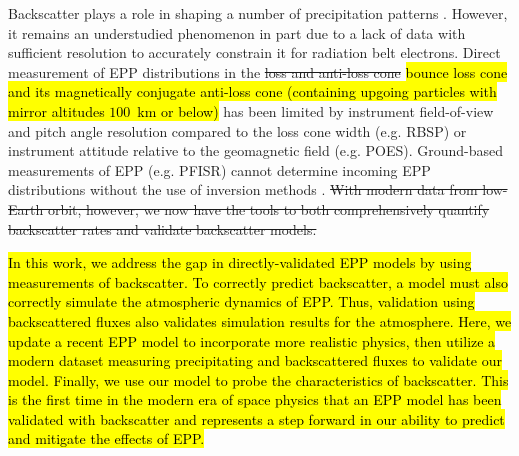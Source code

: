 \documentclass[draft]{agujournal2019}
\begin{document}
Backscatter plays a role in shaping a number of precipitation patterns \cite{wetzel2024, khazanov2021, cotts2011, davidson1977}. However, it remains an understudied phenomenon in part due to a lack of data with sufficient resolution to accurately constrain it for radiation belt electrons. Direct measurement of EPP distributions in the \st{loss and anti-loss cone} \hl{bounce loss cone and its magnetically conjugate anti-loss cone (containing upgoing particles with mirror altitudes $100$~km or below)} has been limited by instrument field-of-view and pitch angle resolution compared to the loss cone width (e.g. RBSP) or instrument attitude relative to the geomagnetic field (e.g. POES). Ground-based measurements of EPP (e.g. PFISR) cannot determine incoming EPP distributions without the use of inversion methods \cite{juarez2023, sanchez2022, turunen2016, miyoshi2015}. \st{With modern data from low-Earth orbit, however, we now have the tools to both comprehensively quantify backscatter rates and validate backscatter models.} 

\hl{In this work, we address the gap in directly-validated EPP models by using measurements of backscatter. To correctly predict backscatter, a model must also correctly simulate the atmospheric dynamics of EPP. Thus, validation using backscattered fluxes also validates simulation results for the atmosphere. Here, we update a recent EPP model to incorporate more realistic physics, then utilize a modern dataset measuring precipitating and backscattered fluxes to validate our model. Finally, we use our model to probe the characteristics of backscatter. This is the first time in the modern era of space physics that an EPP model has been validated with backscatter and represents a step forward in our ability to predict and mitigate the effects of EPP.}
\end{document}
